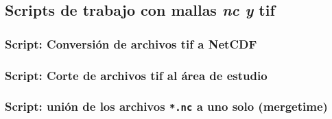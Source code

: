 \documentclass[
  11pt,
  letterpaper,
  DIV=11,
  numbers=noendperiod]{scrartcl}
\newenvironment{Shaded}{\begin{snugshade}}{\end{snugshade}}
\newcommand{\AttributeTok}[1]{\textcolor[rgb]{0.13,0.29,0.53}{#1}}
\newcommand{\ControlFlowTok}[1]{\textcolor[rgb]{0.13,0.29,0.53}{\textbf{#1}}}
\newcommand{\ExtensionTok}[1]{#1}
\newcommand{\FunctionTok}[1]{\textcolor[rgb]{0.13,0.29,0.53}{\textbf{#1}}}
\newcommand{\KeywordTok}[1]{\textcolor[rgb]{0.13,0.29,0.53}{\textbf{#1}}}
\newcommand{\NormalTok}[1]{#1}
\newcommand{\OperatorTok}[1]{\textcolor[rgb]{0.81,0.36,0.00}{\textbf{#1}}}
\newcommand{\PreprocessorTok}[1]{\textcolor[rgb]{0.56,0.35,0.01}{\textit{#1}}}
\newcommand{\StringTok}[1]{\textcolor[rgb]{0.31,0.60,0.02}{#1}}
\newcommand{\VariableTok}[1]{\textcolor[rgb]{0.00,0.00,0.00}{#1}}
\begin{document}
\subsection{\texorpdfstring{Scripts de trabajo con mallas \emph{nc y
}tif}{Scripts de trabajo con mallas nc y tif}}\label{scripts-de-trabajo-con-mallas-nc-y-tif}

\subsubsection{Script: Conversión de archivos tif a
NetCDF}\label{script-conversiuxf3n-de-archivos-tif-a-netcdf}

\begin{Shaded}
\end{Shaded}

\subsubsection{Script: Corte de archivos tif al área de
estudio}\label{script-corte-de-archivos-tif-al-uxe1rea-de-estudio}

\begin{Shaded}
\end{Shaded}

\subsubsection{\texorpdfstring{Script: unión de los archivos
\texttt{*.nc} a uno solo
(mergetime)}{Script: unión de los archivos *.nc a uno solo (mergetime)}}\label{script-uniuxf3n-de-los-archivos-.nc-a-uno-solo-mergetime}
\end{document}
